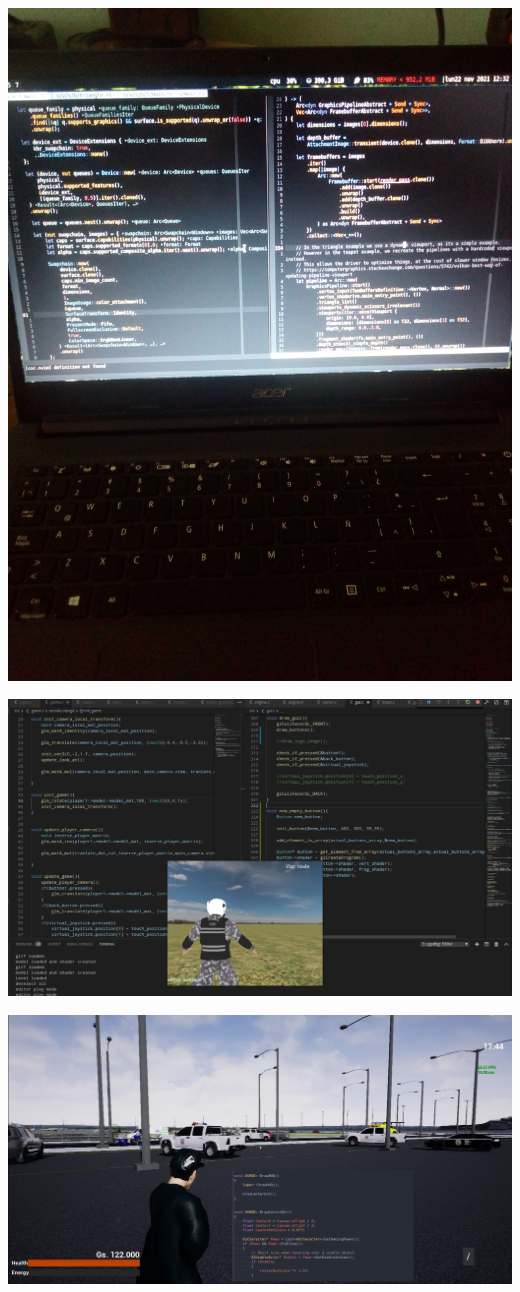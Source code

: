 \documentclass{article}
\begin{document}
  \includegraphics[width=\textwidth]{47.jpg}

  \includegraphics[width=\textwidth]{48.png}

  \includegraphics[width=\textwidth]{49.jpg}
\end{document}
